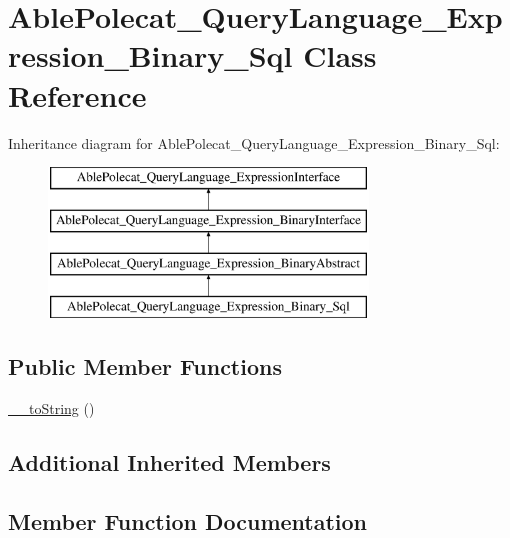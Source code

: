 \hypertarget{class_able_polecat___query_language___expression___binary___sql}{}\section{Able\+Polecat\+\_\+\+Query\+Language\+\_\+\+Expression\+\_\+\+Binary\+\_\+\+Sql Class Reference}
\label{class_able_polecat___query_language___expression___binary___sql}
Inheritance diagram for Able\+Polecat\+\_\+\+Query\+Language\+\_\+\+Expression\+\_\+\+Binary\+\_\+\+Sql\+:\begin{figure}[H]
\begin{center}
\leavevmode
\includegraphics[height=4.000000cm]{class_able_polecat___query_language___expression___binary___sql}
\end{center}
\end{figure}
\subsection*{Public Member Functions}
\begin{DoxyCompactItemize}
\item 
\hyperlink{class_able_polecat___query_language___expression___binary___sql_a7516ca30af0db3cdbf9a7739b48ce91d}{\+\_\+\+\_\+to\+String} ()
\end{DoxyCompactItemize}
\subsection*{Additional Inherited Members}


\subsection{Member Function Documentation}
\hypertarget{class_able_polecat___query_language___expression___binary___sql_a7516ca30af0db3cdbf9a7739b48ce91d}{}

